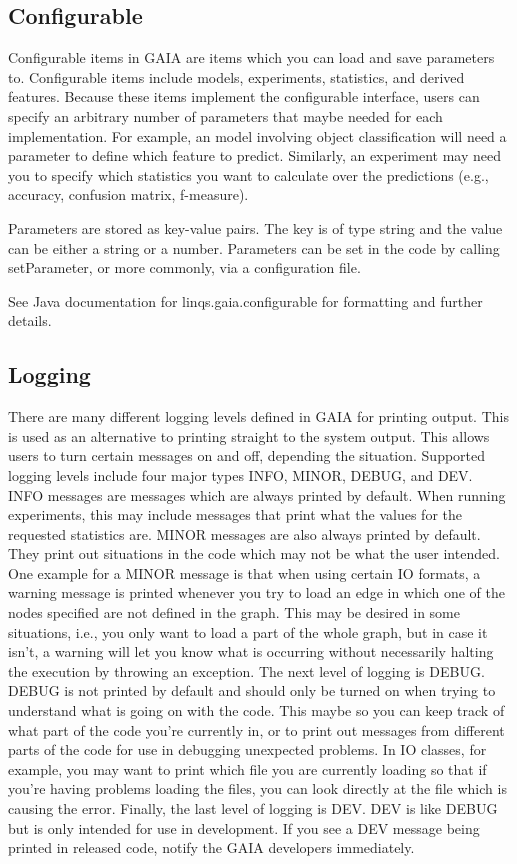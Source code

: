 \subsection{Configurable}
\label{configurable}
Configurable items in GAIA are items which you can load and save
parameters to.  Configurable items include models, experiments,
statistics, and derived features.  Because these items implement
the configurable interface, users can specify an arbitrary number of 
parameters that maybe needed for each implementation.  For example,
an model involving object classification will need a parameter to define
which feature to predict.  Similarly, an experiment may need you to
specify which statistics you want to calculate over the predictions
(e.g., accuracy, confusion matrix, f-measure).

Parameters are stored as key-value pairs.  The key is of type string
and the value can be either a string or a number.  Parameters
can be set in the code by calling setParameter, or more commonly,
via a configuration file.

See Java documentation for linqs.gaia.configurable for formatting
and further details.

\subsection{Logging}
\label{logging}
There are many different logging levels defined in GAIA for printing output.
This is used as an alternative to printing straight to the system output.
This allows users to turn certain messages on and off, depending the situation.
Supported logging levels include four major types INFO, MINOR, DEBUG, and DEV.
INFO messages are messages which are always printed by default.  When running experiments,
this may include messages that print what the values for the requested statistics
are.  MINOR messages are also always printed by default.  They print out
situations in the code which may not be what the user intended.  One example for
a MINOR message is that when using certain IO formats, a warning message
is printed whenever you try to load an edge in which one of the nodes
specified are not defined in the graph.  This may be desired in some situations,
i.e., you only want to load a part of the whole graph, but in case it isn't,
a warning will let you know what is occurring without necessarily halting
the execution by throwing an exception.  The next level of logging is DEBUG.
DEBUG is not printed by default and should only be turned on when trying to understand what is going
on with the code.  This maybe so you can keep track of what part of the
code you're currently in, or to print out messages from different parts of the code
for use in debugging unexpected problems.  In IO classes, for example,
you may want to print which file you are currently loading so that if you're having
problems loading the files, you can look directly at the file which is causing the error.
Finally, the last level of logging is DEV.  DEV is like DEBUG but is only intended
for use in development.  If you see a DEV message being printed in released code,
notify the GAIA developers immediately.

